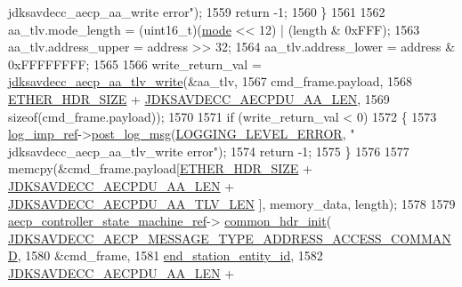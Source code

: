 \begin{DoxyCode}
{      jdksavdecc\_aecp\_aa\_write error"});
1559         \textcolor{keywordflow}{return} -1;
1560     \}
1561 
1562     aa\_tlv.mode\_length = (uint16\_t)(\hyperlink{rawsock__tx_8c_a1ea5d0cb93f22f7d0fdf804bd68c3326}{mode} << 12) | (length & 0xFFF);
1563     aa\_tlv.address\_upper = address >> 32;
1564     aa\_tlv.address\_lower = address & 0xFFFFFFFF;
1565 
1566     write\_return\_val = \hyperlink{group__aecp__aa__tlv_ga6540f6de6d7c49a5455ac50128be2dba}{jdksavdecc\_aecp\_aa\_tlv\_write}(&aa\_tlv,
1567                                                     cmd\_frame.payload,
1568                                                     \hyperlink{namespaceavdecc__lib_a6c827b1a0d973e18119c5e3da518e65ca9512ad9b34302ba7048d88197e0a2dc0}{ETHER\_HDR\_SIZE} + 
      \hyperlink{group___a_e_c_p___a_a__offsets_ga624792b524d0f0f8ef18c2f4895003aa}{JDKSAVDECC\_AECPDU\_AA\_LEN},
1569                                                     \textcolor{keyword}{sizeof}(cmd\_frame.payload));
1570 
1571     \textcolor{keywordflow}{if} (write\_return\_val < 0)
1572     \{
1573         \hyperlink{namespaceavdecc__lib_acbe3e2a96ae6524943ca532c87a28529}{log\_imp\_ref}->\hyperlink{classavdecc__lib_1_1log_a68139a6297697e4ccebf36ccfd02e44a}{post\_log\_msg}(\hyperlink{namespaceavdecc__lib_a501055c431e6872ef46f252ad13f85cdaf2c4481208273451a6f5c7bb9770ec8a}{LOGGING\_LEVEL\_ERROR}, \textcolor{stringliteral}{"
      jdksavdecc\_aecp\_aa\_tlv\_write error"});
1574         \textcolor{keywordflow}{return} -1;
1575     \}
1576 
1577     memcpy(&cmd\_frame.payload[\hyperlink{namespaceavdecc__lib_a6c827b1a0d973e18119c5e3da518e65ca9512ad9b34302ba7048d88197e0a2dc0}{ETHER\_HDR\_SIZE} + 
      \hyperlink{group___a_e_c_p___a_a__offsets_ga624792b524d0f0f8ef18c2f4895003aa}{JDKSAVDECC\_AECPDU\_AA\_LEN} + \hyperlink{group___a_e_c_p___a_a__tlv_ga8c9adb511e50d7ed81e30527a0f86d5b}{JDKSAVDECC\_AECPDU\_AA\_TLV\_LEN}
      ], memory\_data, length);
1578 
1579     \hyperlink{namespaceavdecc__lib_a0b1b5aea3c0490f77cbfd9178af5be22}{aecp\_controller\_state\_machine\_ref}->
      \hyperlink{classavdecc__lib_1_1aecp__controller__state__machine_aafc737d7ed17a62fed9df6528f18d3ec}{common\_hdr\_init}(
      \hyperlink{group__aecp__message__type_gab24ef3f0c1054f136d5c56c0c8bc3132}{JDKSAVDECC\_AECP\_MESSAGE\_TYPE\_ADDRESS\_ACCESS\_COMMAND},
1580                                                        &cmd\_frame,
1581                                                        \hyperlink{classavdecc__lib_1_1end__station__imp_ac32ac278fb799e1b4f0cd539e0abe2b5}{end\_station\_entity\_id},
1582                                                        \hyperlink{group___a_e_c_p___a_a__offsets_ga624792b524d0f0f8ef18c2f4895003aa}{JDKSAVDECC\_AECPDU\_AA\_LEN} + 

\end{DoxyCode}
